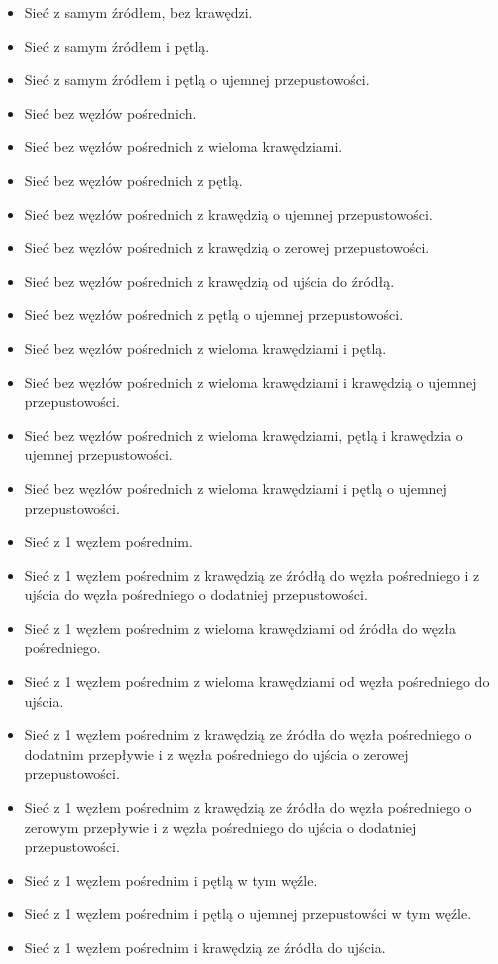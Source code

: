 \documentclass[10pt]{dokument-tiwo}
\begin{document}
    \begin{itemize}
    \item Sieć z samym źródłem, bez krawędzi.
    \item Sieć z samym źródłem i pętlą.
    \item Sieć z samym źródłem i pętlą o ujemnej przepustowości.


    \item Sieć bez węzłów pośrednich.
    \item Sieć bez węzłów pośrednich z wieloma krawędziami.
    \item Sieć bez węzłów pośrednich z pętlą.
    \item Sieć bez węzłów pośrednich z krawędzią o ujemnej przepustowości.
    \item Sieć bez węzłów pośrednich z krawędzią o zerowej przepustowości.
    \item Sieć bez węzłów pośrednich z krawędzią od ujścia do źródłą.
    \item Sieć bez węzłów pośrednich z pętlą o ujemnej przepustowości.
    \item Sieć bez węzłów pośrednich z wieloma krawędziami i pętlą.
    \item Sieć bez węzłów pośrednich z wieloma krawędziami i krawędzią o ujemnej przepustowości.
    \item Sieć bez węzłów pośrednich z wieloma krawędziami, pętlą i krawędzia o ujemnej przepustowości.
    \item Sieć bez węzłów pośrednich z wieloma krawędziami i pętlą o ujemnej przepustowości.   
 

    \item Sieć z 1 węzłem pośrednim.
    \item Sieć z 1 węzłem pośrednim z krawędzią ze źródłą do węzła pośredniego i z ujścia do węzła pośredniego o dodatniej przepustowości.
    \item Sieć z 1 węzłem pośrednim z wieloma krawędziami od źródła do węzła pośredniego.
    \item Sieć z 1 węzłem pośrednim z wieloma krawędziami od węzła pośredniego do ujścia.
    \item Sieć z 1 węzłem pośrednim z krawędzią ze źródła do węzła pośredniego o dodatnim przepływie i z węzła pośredniego do ujścia o zerowej przepustowości.
    \item Sieć z 1 węzłem pośrednim z krawędzią ze źródła do węzła pośredniego o zerowym przepływie i z węzła pośredniego do ujścia o dodatniej przepustowości.
    \item Sieć z 1 węzłem pośrednim i pętlą w tym węźle.
    \item Sieć z 1 węzłem pośrednim i pętlą o ujemnej przepustowści w tym węźle.
    \item Sieć z 1 węzłem pośrednim i krawędzią ze źródła do ujścia.
    \end{itemize}
\end{document}
